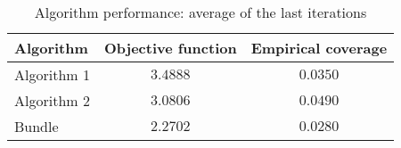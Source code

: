 \begin{table}[ht]
    \centering
    \begin{tabular}{lcc}
    \toprule
    \textbf{Algorithm} & \textbf{Objective function} & \textbf{Empirical coverage} \\
    \midrule
    Algorithm 1 & $3.4888$ & $0.0350$ \\
Algorithm 2 & $3.0806$ & $0.0490$ \\
Bundle & $2.2702$ & $0.0280$ \\
\bottomrule
    \end{tabular}
    \caption{Algorithm performance: average of the last iterations}
    \end{table}